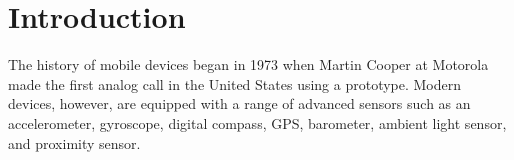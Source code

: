 \section{Introduction}

The history of mobile devices began in 1973 when Martin Cooper at Motorola made the first analog call in the United States using a prototype.
Modern devices, however, are equipped with a range of advanced sensors such as an accelerometer, gyroscope, digital compass, GPS, barometer, ambient light sensor, and proximity sensor.


